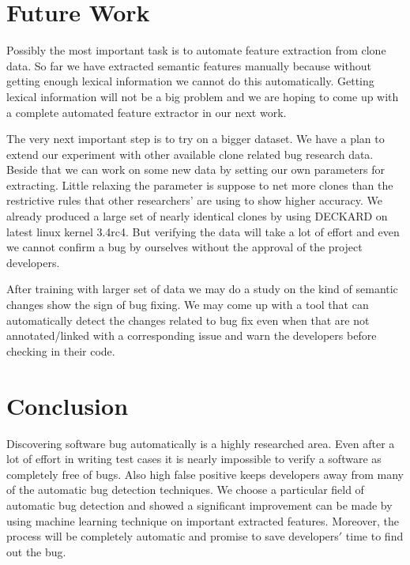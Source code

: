 \documentclass[nocopyrightspace]{sigplanconf}
\begin{document}
\section{Future Work}
Possibly the most important task is to automate feature extraction from clone data. So far we have extracted semantic features manually because without getting enough lexical information we cannot do this automatically. Getting lexical information will not be a big problem and we are hoping to come up with a complete automated feature extractor in our next work.

\vspace{10pt}
\noindent
The very next important step is to try on a bigger dataset. We have a plan to extend our experiment with other available clone related bug research data. Beside that we can work on some new data by setting our own parameters for extracting. Little relaxing the parameter is suppose to net more clones than the restrictive rules that other researchers' are using to show higher accuracy. We already produced a large set of nearly identical clones by using DECKARD on latest linux kernel 3.4rc4. But verifying the data will take a lot of effort and even we cannot confirm a bug by ourselves without the approval of the project developers.

\vspace{10pt}
\noindent
After training with larger set of data we may do a study on the kind of semantic changes show the sign of bug fixing. We may come up with a tool that can automatically detect the changes related to bug fix even when that are not annotated/linked with a corresponding issue and warn the developers before checking in their code.

\section{Conclusion}
Discovering software bug automatically is a highly researched area. Even after a lot of effort in writing test cases it is nearly impossible to verify a software as completely free of bugs. Also high false positive keeps developers away from many of the automatic bug detection techniques. We choose a particular field of automatic bug detection and showed a significant improvement can be made by using machine learning technique on important extracted features. Moreover, the process will be completely automatic and promise to save developers$'$ time to find out the bug.



\end{document}
